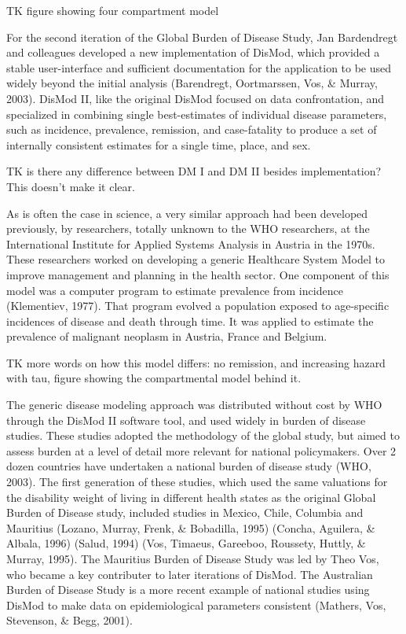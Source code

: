 TK figure showing four compartment model

For the second iteration of the Global Burden of Disease Study, Jan
Bardendregt and colleagues developed a new implementation of DisMod,
which provided a stable user-interface and sufficient documentation
for the application to be used widely beyond the initial analysis
(Barendregt, Oortmarssen, Vos, \& Murray, 2003). DisMod II, like the
original DisMod focused on data confrontation, and specialized in
combining single best-estimates of individual disease parameters, such
as incidence, prevalence, remission, and case-fatality to produce a
set of internally consistent estimates for a single time, place, and
sex.

TK is there any difference between DM I and DM II besides
implementation?  This doesn't make it clear.

As is often the case in science, a very similar approach had been
developed previously, by researchers, totally unknown to the WHO
researchers, at the International Institute for Applied Systems
Analysis in Austria in the 1970s. These researchers worked on
developing a generic Healthcare System Model to improve management and
planning in the health sector. One component of this model was a
computer program to estimate prevalence from incidence (Klementiev,
1977). That program evolved a population exposed to age-specific
incidences of disease and death through time. It was applied to
estimate the prevalence of malignant neoplasm in Austria, France and
Belgium.

TK more words on how this model differs: no remission, and increasing
hazard with tau, figure showing the compartmental model behind it.

The generic disease modeling approach was distributed without cost by
WHO through the DisMod II software tool, and used widely in burden of
disease studies. These studies adopted the methodology of the global
study, but aimed to assess burden at a level of detail more relevant
for national policymakers. Over 2 dozen countries have undertaken a
national burden of disease study (WHO, 2003). The first generation of
these studies, which used the same valuations for the disability
weight of living in different health states as the original Global
Burden of Disease study, included studies in Mexico, Chile, Columbia
and Mauritius (Lozano, Murray, Frenk, \& Bobadilla, 1995) (Concha,
Aguilera, \& Albala, 1996) (Salud, 1994) (Vos, Timaeus, Gareeboo,
Roussety, Huttly, \& Murray, 1995). The Mauritius Burden of Disease
Study was led by Theo Vos, who became a key contributer to later
iterations of DisMod. The Australian Burden of Disease Study is a more
recent example of national studies using DisMod to make data on
epidemiological parameters consistent (Mathers, Vos, Stevenson, \&
Begg, 2001).

